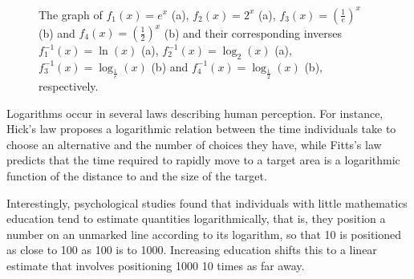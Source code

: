 \begin{figure}[h]
\centering
\centerline{
\hspace{1cm}
}	
\caption{The graph of $f_1(x)=e^x$ (a), $f_2(x)=2^x$ (a), $f_3(x)=\left(\frac{1}{e}\right)^x$ (b) and $f_4(x)=\left(\frac{1}{2}\right)^x$  (b) and their corresponding inverses $f_1^{-1}(x)=\ln(x)$ (a), $f_2^{-1}(x)=\log_2(x)$ (a), $f_3^{-1}(x)=\log_{\frac{1}{e}}(x)$ (b) and $f_4^{-1}(x)=\log_{\frac{1}{2}}(x)$ (b), respectively.}
\label{fig_trans_4}
\end{figure}

\ifcourse
\begin{remark}
Logarithms occur in several laws describing human perception. For instance,  Hick's law proposes a logarithmic relation between the time individuals take to choose an alternative and the number of choices they have, while Fitts's law predicts that the time required to rapidly move to a target area is a logarithmic function of the distance to and the size of the target.

Interestingly, psychological studies found that individuals with little mathematics education tend to estimate quantities logarithmically, that is, they position a number on an unmarked line according to its logarithm, so that 10 is positioned as close to 100 as 100 is to 1000. Increasing education shifts this to a linear estimate that involves positioning 1000 10 times as far away.
\end{remark}

